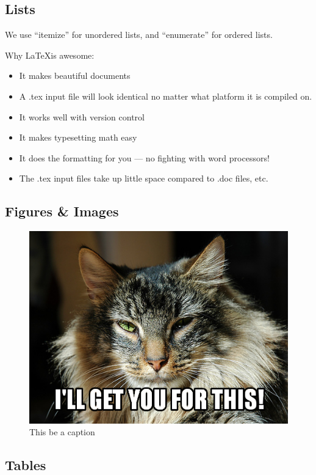 \documentclass{article}
\begin{document}
\subsection{Lists}

We use ``itemize'' for unordered lists, and ``enumerate'' for ordered lists.

Why \LaTeX is awesome:

\begin{itemize}
\item It makes beautiful documents
\item A .tex input file will look identical no matter what platform it is
compiled on.
\item It works well with version control
\item It makes typesetting math easy
\item It does the formatting for you --- no fighting with word processors!
\item The .tex input files take up little space compared to .doc files, etc.
\end{itemize}

\subsection{Figures \& Images}

\begin{figure}[ht!]
\centering
\includegraphics[scale=0.4,angle=90]{resources/img.png}
\caption{This be a caption}
\label{fig:img}
\end{figure}

\subsection{Tables}
\end{document}
